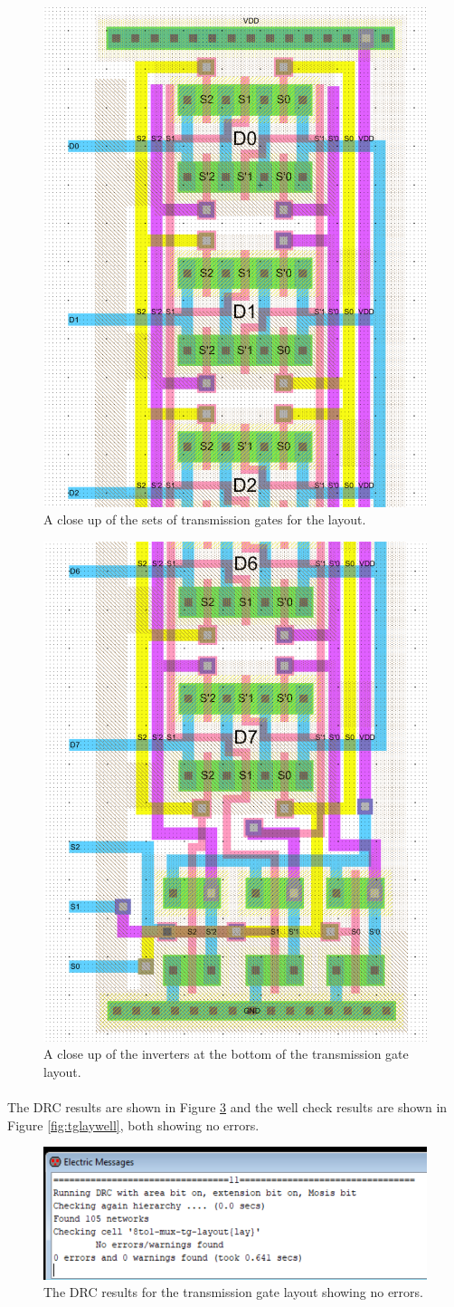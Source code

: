 \documentclass{article}
\begin{document}
    \begin{figure}[H]
      \centering
      \includegraphics[width=0.45\linewidth, frame]{screenshots/tg/lay/lay2.png}
      \caption{A close up of the sets of transmission gates for the layout.}
      \label{fig:tglay2}
    \end{figure}

    \begin{figure}[H]
      \centering
      \includegraphics[width=0.45\linewidth, frame]{screenshots/tg/lay/lay3.png}
      \caption{A close up of the inverters at the bottom of the transmission gate layout.}
      \label{fig:tglay3}
    \end{figure}

    \paragraph{}
    The DRC results are shown in Figure \ref{fig:tglaydrc} and the well check results are shown in Figure \ref{fig:tglaywell}, both showing no errors.

    \begin{figure}[H]
      \centering
      \includegraphics[width=0.6\linewidth, frame]{screenshots/tg/lay/drc.png}
      \caption{The DRC results for the transmission gate layout showing no errors.}
      \label{fig:tglaydrc}
    \end{figure}
\end{document}
